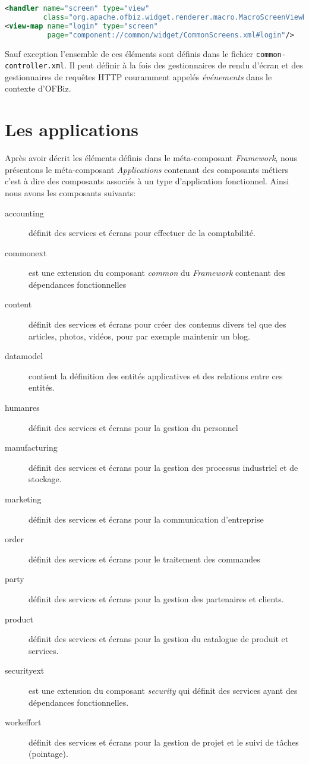 \documentclass[a4paper, 11pt]{report}
\begin{document}
\begin{lstlisting}[language=xml]
<handler name="screen" type="view"
         class="org.apache.ofbiz.widget.renderer.macro.MacroScreenViewHandler"/>
<view-map name="login" type="screen"
          page="component://common/widget/CommonScreens.xml#login"/>
\end{lstlisting}

Sauf exception l'ensemble de ces éléments sont définis dans le fichier
\verb=common-controller.xml=. Il peut définir à la fois des
gestionnaires de rendu d'écran et des gestionnaires de requêtes HTTP
couramment appelés \emph{événements} dans le contexte d'OFBiz.

\section{Les applications}

Après avoir décrit les éléments définis dans le méta-composant
\emph{Framework}, nous présentons le méta-composant
\emph{Applications} contenant des composants métiers c'est à dire des
composants associés à un type d'application fonctionnel. Ainsi nous
avons les composants suivants:

\begin{description}
\item[accounting] définit des services et écrans pour effectuer de la
  comptabilité.
\item[commonext] est une extension du composant \emph{common} du
  \emph{Framework} contenant des dépendances fonctionnelles
\item[content] définit des services et écrans pour créer des contenus
  divers tel que des articles, photos, vidéos, pour par exemple
  maintenir un blog.
\item[datamodel] contient la définition des entités
  applicatives et des relations entre ces entités.
\item[humanres] définit des services et écrans pour la gestion du
  personnel
\item[manufacturing] définit des services et écrans pour la gestion des
  processus industriel et de stockage.
\item[marketing] définit des services et écrans pour la communication
  d'entreprise
\item[order] définit des services et écrans pour le traitement des commandes
\item[party] définit des services et écrans pour la gestion des
  partenaires et clients.
\item[product] définit des services et écrans pour la gestion du
  catalogue de produit et services.
\item[securityext] est une extension du composant \emph{security} qui
  définit des services ayant des dépendances fonctionnelles.
\item[workeffort] définit des services et écrans pour la gestion de
  projet et le suivi de tâches (pointage).
\end{description}
\end{document}
